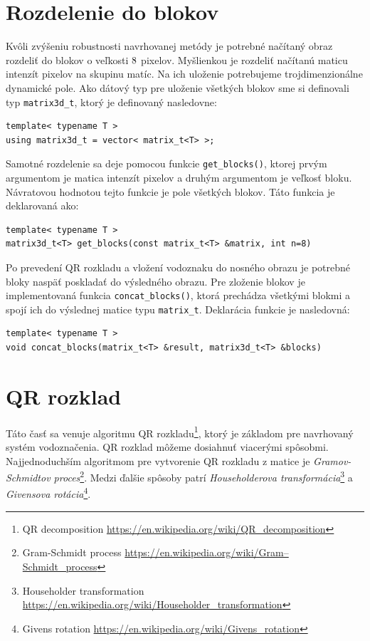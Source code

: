 \section{Rozdelenie do blokov}
\label{impl:divide}
Kvôli zvýšeniu robustnosti navrhovanej metódy je potrebné načítaný obraz rozdeliť do blokov o veľkosti $8\time8$ pixelov. Myšlienkou je rozdeliť načítanú maticu intenzít pixelov na skupinu matíc. Na ich uloženie potrebujeme trojdimenzionálne dynamické pole. Ako dátový typ pre uloženie všetkých blokov sme si definovali typ {\tt matrix3d\_t}, ktorý je definovaný nasledovne:
\begin{lstlisting}
template< typename T >
using matrix3d_t = vector< matrix_t<T> >;
\end{lstlisting}

Samotné rozdelenie sa deje pomocou funkcie {\tt get\_blocks()}, ktorej prvým argumentom je matica intenzít pixelov a druhým argumentom je veľkosť bloku. Návratovou hodnotou tejto funkcie je pole všetkých blokov. Táto funkcia je deklarovaná ako:
\begin{lstlisting}
template< typename T >
matrix3d_t<T> get_blocks(const matrix_t<T> &matrix, int n=8)
\end{lstlisting}

Po prevedení QR rozkladu a vložení vodoznaku do nosného obrazu je potrebné bloky naspäť poskladať do výsledného obrazu. Pre zloženie blokov je implementovaná funkcia {\tt concat\_blocks()}, ktorá prechádza všetkými blokmi a spojí ich do výslednej matice typu {\tt matrix\_t}. Deklarácia funkcie je nasledovná:
\begin{lstlisting}
template< typename T >
void concat_blocks(matrix_t<T> &result, matrix3d_t<T> &blocks)
\end{lstlisting}

\section{QR rozklad}
\label{impl:qr}
Táto časť sa venuje algoritmu QR rozkladu\footnote{QR decomposition \url{https://en.wikipedia.org/wiki/QR_decomposition}}, ktorý je základom pre navrhovaný systém vodoznačenia. QR rozklad môžeme dosiahnuť viacerými spôsobmi. Najjednoduchším algoritmom pre vytvorenie QR rozkladu z matice je {\it Gramov-Schmidtov proces}\footnote{Gram-Schmidt process \url{https://en.wikipedia.org/wiki/Gram–Schmidt_process}}. Medzi ďalšie spôsoby patrí {\it Householderova transformácia}\footnote{Householder transformation \url{https://en.wikipedia.org/wiki/Householder_transformation}} a {\it Givensova rotácia}\footnote{Givens rotation \url{https://en.wikipedia.org/wiki/Givens_rotation}}.

